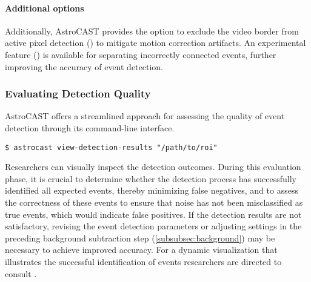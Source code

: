 \paragraph{Additional options}
Additionally, AstroCAST provides the option to exclude the video border from active pixel detection () to mitigate motion correction artifacts. An experimental feature () is available for separating incorrectly connected events, further improving the accuracy of event detection.

\subsubsection{Evaluating Detection Quality}
AstroCAST offers a streamlined approach for assessing the quality of event detection through its command-line interface.

\begin{lstlisting}[style=bashStyle]
    $ astrocast view-detection-results "/path/to/roi"
\end{lstlisting}

Researchers can visually inspect the detection outcomes. During this evaluation phase, it is crucial to determine whether the detection process has successfully identified all expected events, thereby minimizing false negatives, and to assess the correctness of these events to ensure that noise has not been misclassified as true events, which would indicate false positives. If the detection results are not satisfactory, revising the event detection parameters or adjusting settings in the preceding background subtraction step (\ref{subsubsec:background}) may be necessary to achieve improved accuracy. For a dynamic visualization that illustrates the successful identification of events researchers are directed to consult .
